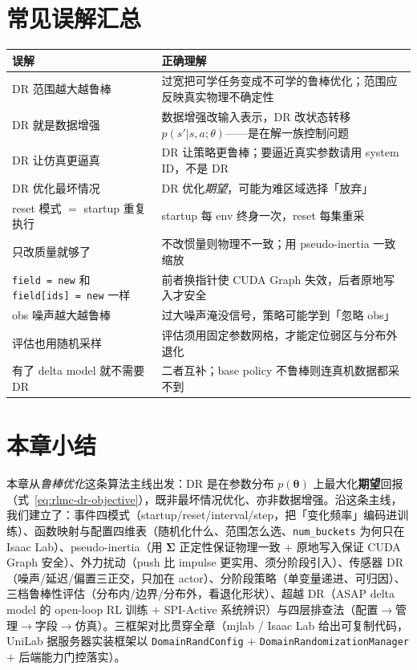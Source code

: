 \section*{常见误解汇总}
\label{sec:rlmc-dr-myths}

\begin{center}
\small
\begin{tabular}{@{}p{5.4cm}p{7.0cm}@{}}
\toprule
误解 & 正确理解 \\
\midrule
DR 范围越大越鲁棒 & 过宽把可学任务变成不可学的鲁棒优化；范围应反映真实物理不确定性 \\
DR 就是数据增强 & 数据增强改输入表示，DR 改状态转移 $p(s'|s,a;\theta)$——是在解一族控制问题 \\
DR 让仿真更逼真 & DR 让策略更鲁棒；要逼近真实参数请用 system ID，不是 DR \\
DR 优化最坏情况 & DR 优化\emph{期望}，可能为难区域选择「放弃」 \\
reset 模式 $=$ startup 重复执行 & startup 每 env 终身一次，reset 每集重采 \\
只改质量就够了 & 不改惯量则物理不一致；用 pseudo-inertia 一致缩放 \\
\verb|field = new| 和 \verb|field[ids] = new| 一样 & 前者换指针使 CUDA Graph 失效，后者原地写入才安全 \\
obs 噪声越大越鲁棒 & 过大噪声淹没信号，策略可能学到「忽略 obs」 \\
评估也用随机采样 & 评估须用固定参数网格，才能定位弱区与分布外退化 \\
有了 delta model 就不需要 DR & 二者互补；base policy 不鲁棒则连真机数据都采不到 \\
\bottomrule
\end{tabular}
\end{center}

\section*{本章小结}
\label{sec:rlmc-dr-summary}

本章从\emph{鲁棒优化}这条算法主线出发：DR 是在参数分布 $p(\boldsymbol\theta)$ 上最大化\textbf{期望}回报（式~\eqref{eq:rlmc-dr-objective}），既非最坏情况优化、亦非数据增强。沿这条主线，我们建立了：事件四模式（startup/reset/interval/step，把「变化频率」编码进训练）、函数映射与配置四维表（随机化什么、范围怎么选、\verb|num_buckets| 为何只在 Isaac Lab）、pseudo-inertia（用 $\boldsymbol\Sigma$ 正定性保证物理一致 $+$ 原地写入保证 CUDA Graph 安全）、外力扰动（push 比 impulse 更实用、须分阶段引入）、传感器 DR（噪声/延迟/偏置三正交，只加在 actor）、分阶段策略（单变量递进、可归因）、三档鲁棒性评估（分布内/边界/分布外，看退化形状）、超越 DR（ASAP delta model 的 open-loop RL 训练 $+$ SPI-Active 系统辨识）与四层排查法（配置$\to$管理$\to$字段$\to$仿真）。三框架对比贯穿全章（mjlab / Isaac Lab 给出可复制代码，UniLab 据服务器实装框架以 \verb|DomainRandConfig| $+$ \verb|DomainRandomizationManager| $+$ 后端能力门控落实）。

